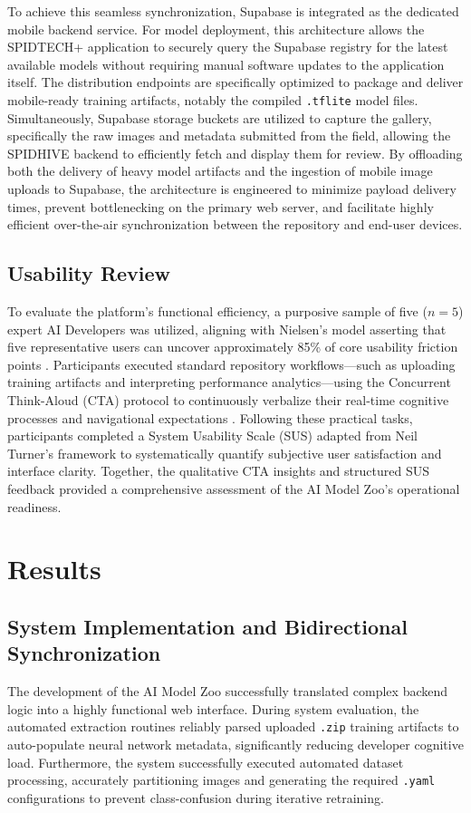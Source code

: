 \documentclass[journal]{./IEEE/IEEEtran}
\begin{document}
To achieve this seamless synchronization, Supabase is integrated as the dedicated mobile backend service. For model deployment, this architecture allows the SPIDTECH+ application to securely query the Supabase registry for the latest available models without requiring manual software updates to the application itself. The distribution endpoints are specifically optimized to package and deliver mobile-ready training artifacts, notably the compiled \texttt{.tflite} model files. Simultaneously, Supabase storage buckets are utilized to capture the gallery, specifically the raw images and metadata submitted from the field, allowing the SPIDHIVE backend to efficiently fetch and display them for review. By offloading both the delivery of heavy model artifacts and the ingestion of mobile image uploads to Supabase, the architecture is engineered to minimize payload delivery times, prevent bottlenecking on the primary web server, and facilitate highly efficient over-the-air synchronization between the repository and end-user devices.

\subsection{Usability Review}
To evaluate the platform's functional efficiency, a purposive sample of five ($n=5$) expert AI Developers was utilized, aligning with Nielsen's model asserting that five representative users can uncover approximately 85\% of core usability friction points \cite{Nielsen_2024}. Participants executed standard repository workflows—such as uploading training artifacts and interpreting performance analytics—using the Concurrent Think-Aloud (CTA) protocol to continuously verbalize their real-time cognitive processes and navigational expectations \cite{Moran_2026}. Following these practical tasks, participants completed a System Usability Scale (SUS) adapted from Neil Turner’s framework \cite{Sauro} to systematically quantify subjective user satisfaction and interface clarity. Together, the qualitative CTA insights and structured SUS feedback provided a comprehensive assessment of the AI Model Zoo's operational readiness.

\section{Results}
\subsection{System Implementation and Bidirectional Synchronization}
The development of the AI Model Zoo successfully translated complex backend logic into a highly functional web interface. During system evaluation, the automated extraction routines reliably parsed uploaded \texttt{.zip} training artifacts to auto-populate neural network metadata, significantly reducing developer cognitive load. Furthermore, the system successfully executed automated dataset processing, accurately partitioning images and generating the required \texttt{.yaml} configurations to prevent class-confusion during iterative retraining.
\end{document}
